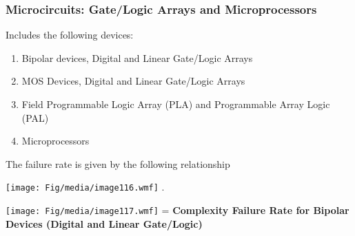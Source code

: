 \subsubsection{Microcircuits: Gate/Logic Arrays and
Microprocessors}\label{microcircuits-gatelogic-arrays-and-microprocessors}

Includes the following devices:

\begin{enumerate}
\def\labelenumi{\arabic{enumi}.}
\item
  Bipolar devices, Digital and Linear Gate/Logic Arrays
\item
  MOS Devices, Digital and Linear Gate/Logic Arrays
\item
  Field Programmable Logic Array (PLA) and Programmable Array Logic
  (PAL)
\item
  Microprocessors
\end{enumerate}

The failure rate is given by the following relationship

\texttt{[image: Fig/media/image116.wmf]} .

\texttt{[image: Fig/media/image117.wmf]} = \textbf{Complexity Failure
Rate for Bipolar Devices (Digital and Linear Gate/Logic)}

